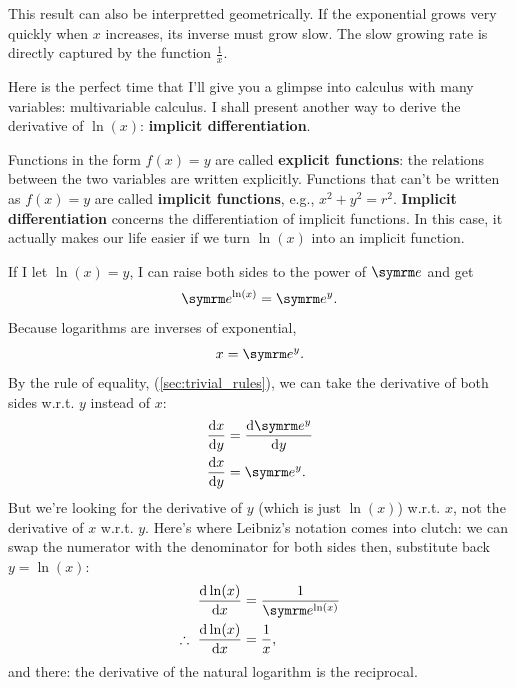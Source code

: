 This result can also be interpretted geometrically. If the exponential grows very quickly when $x$ increases, its inverse must grow slow. The slow growing rate is directly captured by the function $\frac{1}{x}$.

Here is the perfect time that I'll give you a glimpse into calculus with many variables: multivariable calculus. I shall present another way to derive the derivative of $\ln(x)$: \textbf{implicit differentiation}.

Functions in the form $f(x) = y$ are called \textbf{explicit functions}: the relations between the two variables are written explicitly. Functions that can't be written as $f(x) = y$ are called \textbf{implicit functions}, e.g., $x^2 + y^2 = r^2$. \textbf{Implicit differentiation} concerns the differentiation of implicit functions. In this case, it actually makes our life easier if we turn $\ln(x)$ into an implicit function.

If I let $\ln(x) = y$, I can raise both sides to the power of $\e$ and get
\begin{equation}
  \e^{\ln(x)} = \e^y.
\end{equation}
Because logarithms are inverses of exponential,
\begin{equation}
  x = \e^y.
\end{equation}
By the rule of equality, (\cref{sec:trivial_rules}), we can take the derivative of both sides w.r.t. $y$ instead of $x$:
\begin{align*}
  \odv{x}{y} & = \odv{\e^y}{y} \\
  \odv{x}{y} & = \e^y.
\end{align*}
But we're looking for the derivative of $y$ (which is just $\ln(x)$) w.r.t. $x$, not the derivative of $x$ w.r.t. $y$. Here's where Leibniz's notation comes into clutch: we can swap the numerator with the denominator for both sides then, substitute back $y = \ln(x)$:
\begin{align*}
  \odv{\ln(x)}{x}            & = \frac{1}{\e^{\ln(x)}} \\
  \therefore~\odv{\ln(x)}{x} & = \frac{1}{x},
\end{align*}
and there: the derivative of the natural logarithm is the reciprocal.

